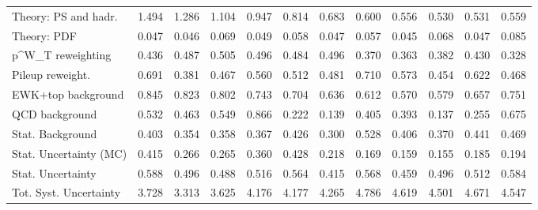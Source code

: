\begin{tabular}{l|p{0.6cm}p{0.6cm}p{0.6cm}p{0.6cm}p{0.6cm}p{0.6cm}p{0.6cm}p{0.6cm}p{0.6cm}p{0.6cm}p{0.6cm}}
Theory: PS and hadr.                     & 1.494 & 1.286 & 1.104 & 0.947 & 0.814 & 0.683 & 0.600 & 0.556 & 0.530 & 0.531 & 0.559 \\
Theory: PDF                              & 0.047 & 0.046 & 0.069 & 0.049 & 0.058 & 0.047 & 0.057 & 0.045 & 0.068 & 0.047 & 0.085 \\
p^{W}_{T} reweighting                    & 0.436 & 0.487 & 0.505 & 0.496 & 0.484 & 0.496 & 0.370 & 0.363 & 0.382 & 0.430 & 0.328 \\
Pileup reweight.                         & 0.691 & 0.381 & 0.467 & 0.560 & 0.512 & 0.481 & 0.710 & 0.573 & 0.454 & 0.622 & 0.468 \\
EWK+top background                       & 0.845 & 0.823 & 0.802 & 0.743 & 0.704 & 0.636 & 0.612 & 0.570 & 0.579 & 0.657 & 0.751 \\
QCD background                           & 0.532 & 0.463 & 0.549 & 0.866 & 0.222 & 0.139 & 0.405 & 0.393 & 0.137 & 0.255 & 0.675 \\
Stat. Background                         & 0.403 & 0.354 & 0.358 & 0.367 & 0.426 & 0.300 & 0.528 & 0.406 & 0.370 & 0.441 & 0.469 \\
Stat. Uncertainty (MC)                   & 0.415 & 0.266 & 0.265 & 0.360 & 0.428 & 0.218 & 0.169 & 0.159 & 0.155 & 0.185 & 0.194 \\
\hline
Stat. Uncertainty                        & 0.588 & 0.496 & 0.488 & 0.516 & 0.564 & 0.415 & 0.568 & 0.459 & 0.496 & 0.512 & 0.584 \\
\hline
Tot. Syst. Uncertainty                   & 3.728 & 3.313 & 3.625 & 4.176 & 4.177 & 4.265 & 4.786 & 4.619 & 4.501 & 4.671 & 4.547 \\
\hline
\end{tabular}
